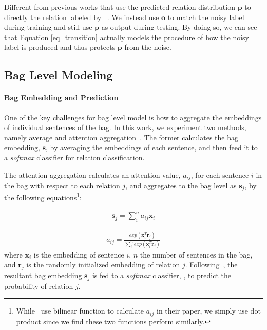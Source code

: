 Different from previous works that use the predicted relation distribution $\mathbf{p}$ to directly  the relation labeled by \DS~\cite{zeng2015distant,lin2016neural}. We instead use $\mathbf{o}$ to match the noisy label during training and still use $\mathbf{p}$ as output during testing.
By doing so, we can see that Equation \ref{eq_transition} actually models the procedure of how the noisy label is produced and thus protects $\mathbf{p}$ from the noise.

\subsection{Bag Level Modeling \label{sec:baglevelmodeling}}
\paragraph{Bag Embedding and Prediction}
One of the key challenges for bag level model is how to aggregate the embeddings of individual sentences of the bag.
In this work, we experiment two methods, namely average and attention aggregation~\cite{lin2016neural}.
The former calculates the bag embedding, $\mathbf{s}$, by averaging the embeddings of each sentence, and  then feed it to a \emph{softmax} classifier for relation classification.

The attention aggregation calculates an attention value, $a_{ij}$, for each sentence $i$ in the bag with respect to each relation $j$, and aggregates to  the bag level as  $\mathbf{s}_j$, by the following equations\footnote{While~\cite{lin2016neural} use bilinear function to calculate $a_{ij}$ in their paper, we simply use dot product since we find these two functions perform similarly.}:

\begin{equation}
\begin{aligned}
\mathbf{s}_j = \sum_i^{n}{a_{ij} \mathbf{x}_{i}}
\end{aligned}
\label{att_sum}
\end{equation}

\begin{equation}
\begin{aligned}
a_{ij} = \frac{exp(\mathbf{x}_i^T \mathbf{r}_j)}{\sum_i^n{exp(\mathbf{x}_i^T \mathbf{r}_j)}}
\end{aligned}
\label{cal_att}
\end{equation}
where $\mathbf{x}_{i}$ is the embedding of sentence $i$, $n$ the number of sentences in the bag, and $\mathbf{r}_j$ is the randomly initialized embedding of relation $j$.
Following~\cite{lin2016neural}, the resultant bag embedding $\mathbf{s}_j$ is fed to a \emph{softmax} classifier, , to predict the probability of relation $j$. 

